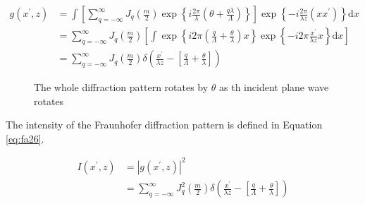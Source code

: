 \documentclass[main.tex]{subfiles}
\begin{document}
\begin{enumerate}
\begin{enumerate}
\begin{equation}\label{eq:fa25}
\begin{aligned} 
g\left(x^{\prime}, z\right)&= \int\left[\sum_{q=-\infty}^{\infty} J_{q}\left(\frac{m}{2}\right) \exp \left\{i \frac{2 \pi}{\lambda}\left(\theta+\frac{q \lambda}{\Lambda}\right)\right\}\right] \exp \left\{-i \frac{2 \pi}{\lambda z}\left(x x^{\prime}\right)\right\} \mathrm{d} x \\
&=\sum_{q=-\infty}^{\infty} J_{q}\left(\frac{m}{2}\right)\left[\int \exp \left\{i 2 \pi\left(\frac{q}{\Lambda}+\frac{\theta}{\lambda}\right) x\right\} \exp \left\{-i 2 \pi \frac{x^{\prime}}{\lambda z} x\right\} \mathrm{d} x\right] \\
&=\sum_{q=-\infty}^{\infty} J_{q}\left(\frac{m}{2}\right) \delta\left(\frac{x^{\prime}}{\lambda z}-\left[\frac{q}{\Lambda}+\frac{\theta}{\lambda}\right]\right)
\end{aligned} 
\end{equation}

\begin{figure}
\centering{}
\caption{The whole diffraction pattern rotates by $\theta$ as th incident plane wave rotates}
\label{fig:fa21}
\end{figure}

The intensity of the Fraunhofer diffraction pattern is defined in Equation \ref{eq:fa26}.

\begin{equation}\label{eq:fa26}
\begin{aligned} 
I\left(x^{\prime}, z\right)&= \left|g\left(x^{\prime}, z\right)\right|^{2}\\
&=\sum_{q=-\infty}^{\infty} J_{q}^{2}\left(\frac{m}{2}\right) \delta\left(\frac{x^{\prime}}{\lambda z}-\left[\frac{q}{\Lambda}+\frac{\theta}{\lambda}\right]\right)
\end{aligned} 
\end{equation}


\end{enumerate}
\end{enumerate}
\end{document}
